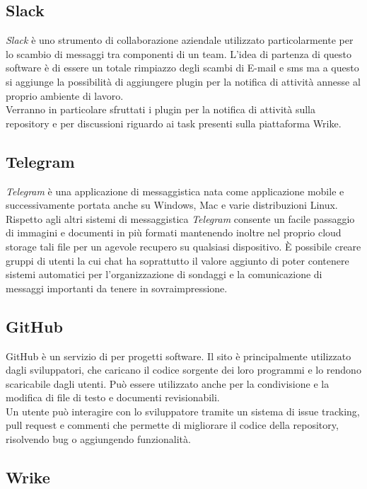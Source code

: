 \documentclass[./../NomeDocumento.tex]{subfiles}
\begin{document}
	\subsection{Slack}
	
	\textit{Slack} è uno strumento di collaborazione aziendale utilizzato particolarmente per lo scambio di messaggi tra componenti di un team. L'idea di partenza di questo software è di essere un totale rimpiazzo degli scambi di E-mail e sms ma a questo si aggiunge la possibilità di aggiungere plugin per la notifica di attività annesse al proprio ambiente di lavoro.
	\\ \noindent Verranno in particolare sfruttati i plugin per la notifica di attività sulla repository e per discussioni riguardo ai task presenti sulla piattaforma Wrike.
	
	\subsection{Telegram}
	
	\textit{Telegram} è una applicazione di messaggistica nata come applicazione mobile e successivamente portata anche su Windows, Mac e varie distribuzioni Linux. Rispetto agli altri sistemi di messaggistica \textit{Telegram} consente un facile passaggio di immagini e documenti in più formati mantenendo inoltre nel proprio cloud storage tali file per un agevole recupero su qualsiasi dispositivo. È possibile creare gruppi di utenti la cui chat ha soprattutto il valore aggiunto di poter contenere sistemi automatici per l'organizzazione di sondaggi e la comunicazione di messaggi importanti da tenere in sovraimpressione.
	
	\subsection{GitHub}
	
	GitHub è un servizio di  per progetti software. 
	Il sito è principalmente utilizzato dagli sviluppatori, che caricano il codice sorgente dei loro programmi e lo rendono scaricabile dagli utenti. Può essere utilizzato anche per la condivisione e la modifica di file di testo e documenti revisionabili.
	\\ \noindent Un utente può interagire con lo sviluppatore tramite un sistema di issue tracking, pull request e commenti che permette di migliorare il codice della repository, risolvendo bug o aggiungendo funzionalità.

	\subsection{Wrike}
\end{document}
